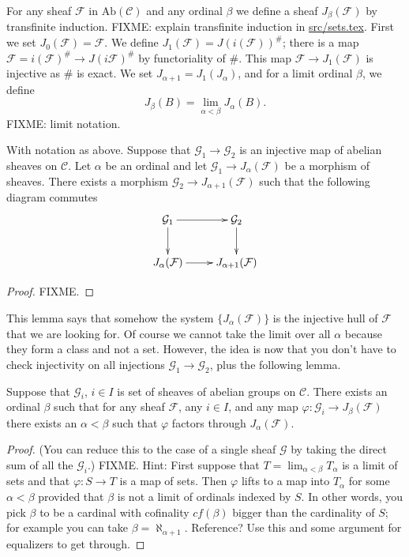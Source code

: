 \smallskip\noindent
For any sheaf $\mathcal{F}$ in $\text{Ab}(\mathcal{C})$ and
any ordinal $\beta$ we define a sheaf
$J_\beta(\mathcal{F})$ by transfinite induction.
FIXME: explain transfinite induction in \url{src/sets.tex}.
First we set $J_0(\mathcal{F})=\mathcal{F}$.
We define $J_1(\mathcal{F})=J(i(\mathcal{F}))^\#$;
there is a map $\mathcal{F}=i(\mathcal{F})^\# \to J(i\mathcal{F})^\#$
by functoriality of $\#$. This map $\mathcal{F} \to J_1(\mathcal{F})$
is injective as $\#$ is exact. We set $J_{\alpha+1}=J_1(J_\alpha)$, 
and for a limit ordinal $\beta$, we define
$$
J_\beta(B) = \lim_{\alpha < \beta} J_\alpha(B).
$$
FIXME: limit notation.

\begin{lemma}
\label{lemma-map-into-next-one}
With notation as above.
Suppose that $\mathcal{G}_1 \to \mathcal{G}_2$ is an injective
map of abelian sheaves on $\mathcal{C}$. Let $\alpha$ be an ordinal
and let $\mathcal{G}_1\to J_\alpha(\mathcal{F})$ be a morphism
of sheaves. There exists a morphism $\mathcal{G}_2 \to
J_{\alpha+1}(\mathcal{F})$ such that the following diagram commutes
$$
\xymatrix{
\mathcal{G}_1 \ar[d] \ar[r] & \mathcal{G}_2 \ar[d] \\
J_{\alpha}(\mathcal{F}) \ar[r] & J_{\alpha+1}(\mathcal{F}) }
$$
\end{lemma}

\begin{proof}
FIXME.
\end{proof}

\noindent
This lemma says that somehow the system $\{J_{\alpha}(\mathcal{F})\}$
is the injective hull of $\mathcal{F}$ that we are looking for. Of course
we cannot take the limit over all $\alpha$ because they form a class
and not a set. However, the idea is now that you don't have to check
injectivity on all injections $\mathcal{G}_1 \to \mathcal{G}_2$, plus
the following lemma.

\begin{lemma}
\label{lemma-map-into-smaller}
Suppose that $\mathcal{G}_i$, $i\in I$ is set of sheaves of abelian 
groups on $\mathcal{C}$. There exists an ordinal $\beta$ such that
for any sheaf $\mathcal{F}$, any $i\in I$, and any map $\varphi : 
\mathcal{G}_i \to J_\beta(\mathcal{F})$ there exists an 
$\alpha < \beta$ such that $ \varphi $ factors through 
$J_\alpha(\mathcal{F})$.
\end{lemma}

\begin{proof}
(You can reduce this to the case of a single sheaf $\mathcal{G}$
by taking the direct sum of all the $\mathcal{G}_i$.)
FIXME. Hint: First suppose that $T = \lim_{\alpha < \beta} T_\alpha$
is a limit of sets and that $\varphi : S \to T$ is a map of sets. 
Then $\varphi$ lifts to a map into $T_\alpha$ for some $\alpha < \beta$
provided that $\beta$ is not a limit of ordinals indexed by $S$.
In other words, you pick $\beta$ to be a cardinal with cofinality
$cf(\beta)$ bigger than the cardinality of $S$; for example you can take 
$\beta = \aleph_{\alpha+1}$. Reference? Use this and
some argument for equalizers to get through.
\end{proof}

